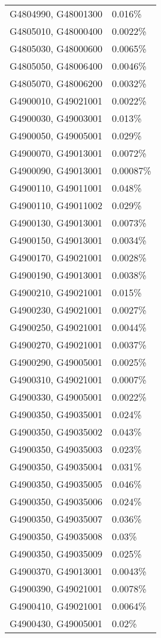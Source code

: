\begin{longtable}[]{@{}ll@{}}
G4804990, G48001300 & 0.016\% \\
G4805010, G48000400 & 0.0022\% \\
G4805030, G48000600 & 0.0065\% \\
G4805050, G48006400 & 0.0046\% \\
G4805070, G48006200 & 0.0032\% \\
G4900010, G49021001 & 0.0022\% \\
G4900030, G49003001 & 0.013\% \\
G4900050, G49005001 & 0.029\% \\
G4900070, G49013001 & 0.0072\% \\
G4900090, G49013001 & 0.00087\% \\
G4900110, G49011001 & 0.048\% \\
G4900110, G49011002 & 0.029\% \\
G4900130, G49013001 & 0.0073\% \\
G4900150, G49013001 & 0.0034\% \\
G4900170, G49021001 & 0.0028\% \\
G4900190, G49013001 & 0.0038\% \\
G4900210, G49021001 & 0.015\% \\
G4900230, G49021001 & 0.0027\% \\
G4900250, G49021001 & 0.0044\% \\
G4900270, G49021001 & 0.0037\% \\
G4900290, G49005001 & 0.0025\% \\
G4900310, G49021001 & 0.0007\% \\
G4900330, G49005001 & 0.0022\% \\
G4900350, G49035001 & 0.024\% \\
G4900350, G49035002 & 0.043\% \\
G4900350, G49035003 & 0.023\% \\
G4900350, G49035004 & 0.031\% \\
G4900350, G49035005 & 0.046\% \\
G4900350, G49035006 & 0.024\% \\
G4900350, G49035007 & 0.036\% \\
G4900350, G49035008 & 0.03\% \\
G4900350, G49035009 & 0.025\% \\
G4900370, G49013001 & 0.0043\% \\
G4900390, G49021001 & 0.0078\% \\
G4900410, G49021001 & 0.0064\% \\
G4900430, G49005001 & 0.02\% \\

\end{longtable}
